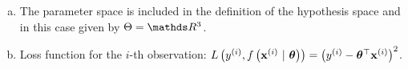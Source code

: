 \documentclass[a4paper]{article}
\begin{document}
{\begin{enumerate}[a)]
  Note the \textbf{slight abuse of notation} here: in the lecture, we first 
  define $\thetab$ to only consist of the feature coefficients, with $\xv$ 
  likewise being the plain feature vector. For the sake of simplicity, however, 
  it is more convenient to append the intercept coefficient to the vector of 
  feature coefficients. This does not change our model formulation, but we have 
  to keep in mind that it implicitly entails adding an element 1 at the first 
  position of each feature vector.
  
  \item The parameter space is included in the definition of the hypothesis 
  space and in this case given by $\Theta = \R^3$.
  
  \item Loss function for the $i$-th observation: $L\left(y^{(i)}, f\left(\mathbf{x}^{(i)} ~|~ \bm{\theta}\right)\right) = \left( y^{(i)} - 
  \bm{\theta}^\top \mathbf{x}^{(i)} \right)^2$.
  

\end{enumerate}}
\end{document}
